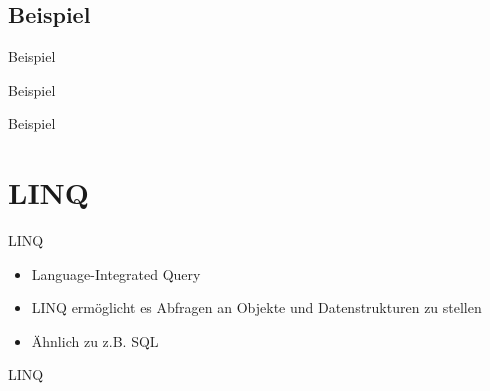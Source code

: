\subsection{Beispiel}
\begin{frame}{Beispiel}
	
\end{frame}

\begin{frame}{Beispiel}
	
\end{frame}

\begin{frame}{Beispiel}
	
\end{frame}

\section{LINQ}
\begin{frame}{LINQ}
	\begin{itemize}
		\item Language-Integrated Query
		\item LINQ ermöglicht es Abfragen an Objekte und Datenstrukturen zu stellen
		\item Ähnlich zu z.B. SQL
	\end{itemize}
\end{frame}

\begin{frame}{LINQ}
		
\end{frame}


